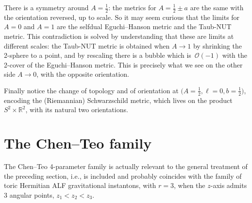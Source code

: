 \documentclass[pdftex]{sigma}
\numberwithin{equation}{section}
\begin{document}
 There is a symmetry around $A=\frac12$: the metrics for $A=\frac12\pm a$ are the same with the orientation reversed, up to scale. So it may seem curious that the limits for $A=0$ and $A=1$ are the selfdual Eguchi--Hanson metric and the Taub-NUT metric. This contradiction is solved by understanding that these are limits at different scales: the Taub-NUT metric is obtained when $A\rightarrow1$ by shrinking the 2-sphere to a point, and by rescaling there is a bubble which is~$\mathcal{O}(-1)$ with the 2-cover of the Eguchi--Hanson metric. This is precisely what we see on the other side $A\rightarrow0$, with the opposite orientation.

Finally notice the change of topology and of orientation at $\big(A = \frac{1}{2}, \ell = 0, b = \frac{1}{2}\big)$, encoding the (Riemannian) Schwarzschild metric, which lives on the product $S^2 \times \mathbb{R} ^2$, with its natural two orientations.






\section{The Chen--Teo family}







The Chen--Teo 4-parameter family is actually relevant to the general treatment of the preceding section, i.e., is included and probably coincides with the family of toric Hermitian ALF gravitational instantons, with $r = 3$, when the $z$-axis admits 3 angular points, $z_1 < z _2 < z _3$.
\end{document}
